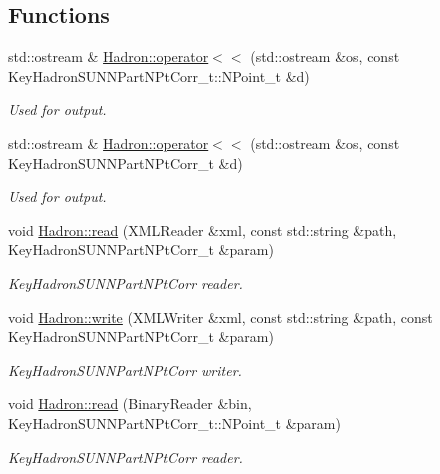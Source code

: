 \subsection*{Functions}
\begin{DoxyCompactItemize}
\item 
std\+::ostream \& \mbox{\hyperlink{namespaceHadron_a2559588d0550564638289369a0d3ba30}{Hadron\+::operator$<$$<$}} (std\+::ostream \&os, const Key\+Hadron\+S\+U\+N\+N\+Part\+N\+Pt\+Corr\+\_\+t\+::\+N\+Point\+\_\+t \&d)
\begin{DoxyCompactList}\small\item\em Used for output. \end{DoxyCompactList}\item 
std\+::ostream \& \mbox{\hyperlink{namespaceHadron_af2ff7a4948a4b5cdeaabc1de5072918c}{Hadron\+::operator$<$$<$}} (std\+::ostream \&os, const Key\+Hadron\+S\+U\+N\+N\+Part\+N\+Pt\+Corr\+\_\+t \&d)
\begin{DoxyCompactList}\small\item\em Used for output. \end{DoxyCompactList}\item 
void \mbox{\hyperlink{namespaceHadron_a921e2dea91400934dabd596c18164033}{Hadron\+::read}} (X\+M\+L\+Reader \&xml, const std\+::string \&path, Key\+Hadron\+S\+U\+N\+N\+Part\+N\+Pt\+Corr\+\_\+t \&param)
\begin{DoxyCompactList}\small\item\em Key\+Hadron\+S\+U\+N\+N\+Part\+N\+Pt\+Corr reader. \end{DoxyCompactList}\item 
void \mbox{\hyperlink{namespaceHadron_abf12b2168d7e3741fcc320bf4b8c53df}{Hadron\+::write}} (X\+M\+L\+Writer \&xml, const std\+::string \&path, const Key\+Hadron\+S\+U\+N\+N\+Part\+N\+Pt\+Corr\+\_\+t \&param)
\begin{DoxyCompactList}\small\item\em Key\+Hadron\+S\+U\+N\+N\+Part\+N\+Pt\+Corr writer. \end{DoxyCompactList}\item 
void \mbox{\hyperlink{namespaceHadron_a61a08fc66a0ee31593a2d5fff5657f7c}{Hadron\+::read}} (Binary\+Reader \&bin, Key\+Hadron\+S\+U\+N\+N\+Part\+N\+Pt\+Corr\+\_\+t\+::\+N\+Point\+\_\+t \&param)
\begin{DoxyCompactList}\small\item\em Key\+Hadron\+S\+U\+N\+N\+Part\+N\+Pt\+Corr reader. \end{DoxyCompactList}\item 

\end{DoxyCompactItemize}
